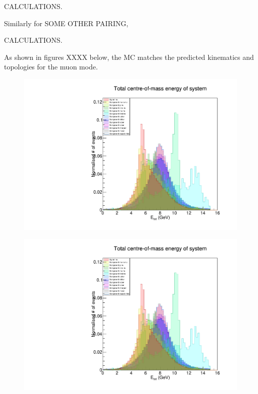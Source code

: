 \documentclass[12pt]{thesis}  %
\begin{document}
CALCULATIONS.

Similarly for SOME OTHER PAIRING,

CALCULATIONS.

As shown in figures XXXX below, the MC matches the predicted kinematics and topologies for the muon mode.


\begin{figure}[h]
\centering
\begin{minipage}{.5\textwidth}
  \centering
  \includegraphics[width=\linewidth]{images/stack/stack_cut6_totalCM_E.pdf}
  \label{fig:test1}
\end{minipage}%
\begin{minipage}{.5\textwidth}
  \centering
  \includegraphics[width=\linewidth]{images/stack/stack_cut6_totalCM_E.pdf}
  \label{fig:test2}
\end{minipage}
\end{figure}
\end{document}
